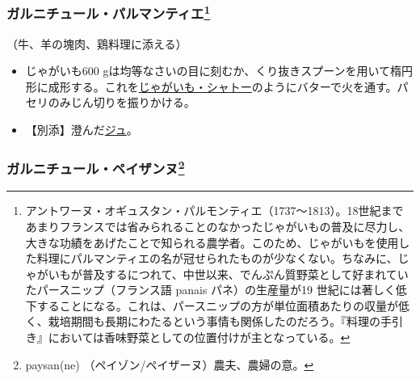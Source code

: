 \begin{recette}
\atoaki{}

\hypertarget{garniture-parmentier}{%
\subsubsection[ガルニチュール・パルマンティエ]{\texorpdfstring{ガルニチュール・パルマンティエ\footnote{アントワーヌ・オギュスタン・パルモンティエ（1737〜1813）。18世紀まであまりフランスでは省みられることのなかったじゃがいもの普及に尽力し、大きな功績をあげたことで知られる農学者。このため、じゃがいもを使用した料理にパルマンティエの名が冠せられたものが少なくない。ちなみに、じゃがいもが普及するにつれて、中世以来、でんぷん質野菜として好まれていたパースニップ（フランス語
  panais パネ）の生産量が19
  世紀には著しく低下することになる。これは、パースニップの方が単位面積あたりの収量が低く、栽培期間も長期にわたるという事情も関係したのだろう。『料理の手引き』においては香味野菜としての位置付けが主となっている。}}{ガルニチュール・パルマンティエ}}\label{garniture-parmentier}}



（牛、羊の塊肉、鶏料理に添える）

\begin{itemize}
\item
  じゃがいも600
  gは均等なさいの目に刻むか、くり抜きスプーンを用いて楕円形に成形する。これを\protect\hyperlink{pommes-de-terre-chateau}{じゃがいも・シャトー}のようにバターで火を通す。パセリのみじん切りを振りかける。
\item
  【別添】澄んだ\protect\hyperlink{jus-de-veau-lie}{ジュ}。
\end{itemize}

\atoaki{}

\hypertarget{garniture-a-la-payasanne}{%
\subsubsection[ガルニチュール・ペイザンヌ]{\texorpdfstring{ガルニチュール・ペイザンヌ\footnote{paysan(ne)
  （ペイゾン/ペイザーヌ）農夫、農婦の意。}}{ガルニチュール・ペイザンヌ}}\label{garniture-a-la-payasanne}}



\end{recette}
